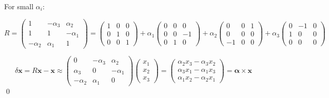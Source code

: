 \documentclass[12pt]{article}
\begin{document}
For small $\alpha_{i}$:

\begin{equation}
    R = \begin{pmatrix}
        1           & -\alpha_{3} & \alpha_{2}  \\
        1           & 1           & -\alpha_{1} \\
        -\alpha_{2} & \alpha_{1}  & 1
    \end{pmatrix}
    =
    \begin{pmatrix}
        1 & 0 & 0 \\
        0 & 1 & 0 \\
        0 & 0 & 1
    \end{pmatrix}
    +
    \alpha_{1} \begin{pmatrix}
        0 & 0 & 0  \\
        0 & 0 & -1 \\
        0 & 1 & 0
    \end{pmatrix}
    +
    \alpha_{2} \begin{pmatrix}
        0  & 0 & 1 \\
        0  & 0 & 0 \\
        -1 & 0 & 0
    \end{pmatrix}
    +
    \alpha_{3} \begin{pmatrix}
        0 & -1 & 0 \\
        1 & 0  & 0 \\
        0 & 0  & 0
    \end{pmatrix}
\end{equation}


\begin{equation}
    \delta \mathbf{x} = R \mathbf{x} - \mathbf{x}
    \approx
    \begin{pmatrix}
        0           & -\alpha_{3} & \alpha_{2}  \\
        \alpha_{3}  & 0           & -\alpha_{1} \\
        -\alpha_{2} & \alpha_{1}  & 0
    \end{pmatrix}
    \begin{pmatrix}
        x_{1} \\
        x_{2} \\
        x_{3}
    \end{pmatrix}
    =
    \begin{pmatrix}
        \alpha_{2} x_{3} - \alpha_{3} x_{2} \\
        \alpha_{3} x_{1} - \alpha_{1} x_{3} \\
        \alpha_{1} x_{2} - \alpha_{2} x_{1}
    \end{pmatrix}
    =
    \mathbf{\alpha} \times \mathbf{x}
\end{equation}
\qed
\end{document}
